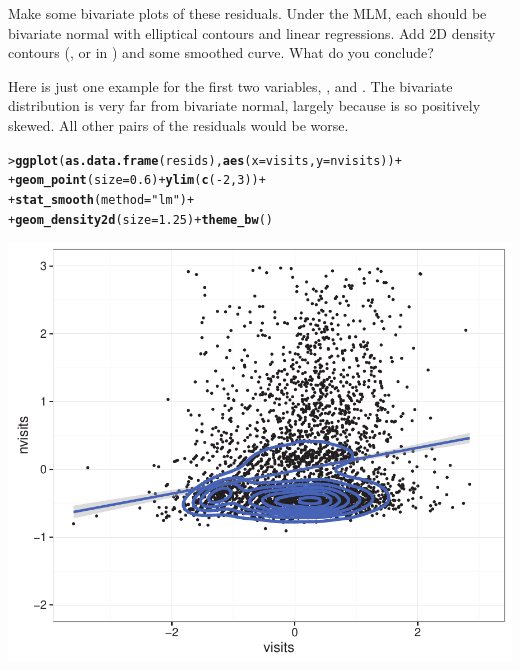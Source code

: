 \documentclass[10pt]{report}\usepackage[]{graphicx}\usepackage[]{color}
\makeatletter
\newcommand{\hlnum}[1]{\textcolor[rgb]{0.686,0.059,0.569}{#1}}%
\newcommand{\hlstr}[1]{\textcolor[rgb]{0.192,0.494,0.8}{#1}}%
\newcommand{\hlopt}[1]{\textcolor[rgb]{0,0,0}{#1}}%
\newcommand{\hlstd}[1]{\textcolor[rgb]{0.345,0.345,0.345}{#1}}%
\newcommand{\hlkwc}[1]{\textcolor[rgb]{0.333,0.667,0.333}{#1}}%
\newcommand{\hlkwd}[1]{\textcolor[rgb]{0.737,0.353,0.396}{\textbf{#1}}}%
\newenvironment{kframe}{%
 \def\at@end@of@kframe{}%
 \ifinner\ifhmode%
  \def\at@end@of@kframe{\end{minipage}}%
  \begin{minipage}{\columnwidth}%
 \fi\fi%
 \def\FrameCommand##1{\hskip\@totalleftmargin \hskip-\fboxsep
 \colorbox{shadecolor}{##1}\hskip-\fboxsep
     \hskip-\linewidth \hskip-\@totalleftmargin \hskip\columnwidth}%
 \MakeFramed {\advance\hsize-\width
   \@totalleftmargin\z@ \linewidth\hsize
   \@setminipage}}%
 {\par\unskip\endMakeFramed%
 \at@end@of@kframe}
\newenvironment{knitrout}{}{} %
\renewenvironment{knitrout}{\small\renewcommand{\baselinestretch}{.85}}{} %
\makeatother
\begin{document}
\begin{Exercises}
\begin{enumerate*}
\begin{ans}
\begin{knitrout}
\end{knitrout}

    \end{ans}
    
    \item Make some bivariate plots of these residuals. Under the MLM, each should be bivariate normal
    with elliptical contours and linear regressions. Add 2D density contours
    (, or  in ) and some smoothed curve.
     What do you conclude?
     \begin{ans}
     Here is just one example for the first two variables, , and .
     The bivariate distribution is very far from bivariate normal, largely because
      is so positively skewed.  All other pairs of the residuals would be worse.
\begin{knitrout}\footnotesize
{}\color{fgcolor}\begin{kframe}
\begin{alltt}
\hlstd{> }\hlkwd{ggplot}\hlstd{(}\hlkwd{as.data.frame}\hlstd{(resids),} \hlkwd{aes}\hlstd{(}\hlkwc{x}\hlstd{=visits,} \hlkwc{y}\hlstd{=nvisits))} \hlopt{+}
\hlstd{+ }        \hlkwd{geom_point}\hlstd{(}\hlkwc{size}\hlstd{=}\hlnum{0.6}\hlstd{)} \hlopt{+} \hlkwd{ylim}\hlstd{(}\hlkwd{c}\hlstd{(}\hlopt{-}\hlnum{2}\hlstd{,} \hlnum{3}\hlstd{))} \hlopt{+}
\hlstd{+ }        \hlkwd{stat_smooth}\hlstd{(}\hlkwc{method}\hlstd{=}\hlstr{"lm"}\hlstd{)} \hlopt{+}
\hlstd{+ }        \hlkwd{geom_density2d}\hlstd{(}\hlkwc{size}\hlstd{=}\hlnum{1.25}\hlstd{)} \hlopt{+} \hlkwd{theme_bw}\hlstd{()}
\end{alltt}
\end{kframe}

\centerline{\includegraphics[width=.6\textwidth]{soln/fig/ex11_8c-1} }




\end{knitrout}
\end{ans}
\end{enumerate*}
\end{Exercises}
\end{document}
